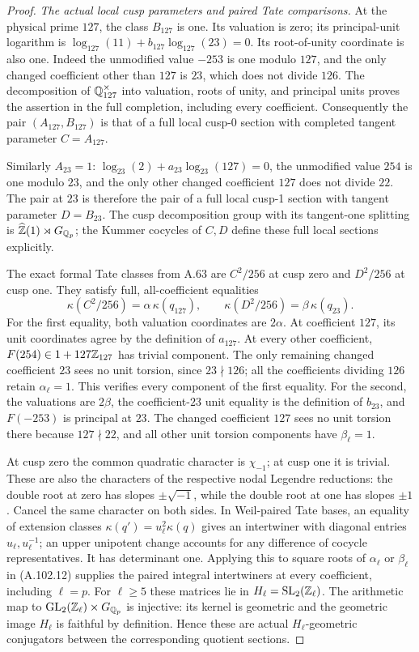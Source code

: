 \begin{proof}
\emph{The actual local cusp parameters and paired Tate comparisons.}
At the physical prime $127$, the class $B_{127}$ is
one.  Its valuation is zero; its principal-unit
logarithm is
$\log_{127}(11)+b_{127}\log_{127}(23)=0$.
Its root-of-unity coordinate is also one.
Indeed the unmodified value $-253$ is one modulo $127$,
and the only changed coefficient other than $127$ is
$23$, which does not divide $126$.
The decomposition of $\mathbb Q_{127}^\times$ into valuation,
roots of unity, and principal units proves the assertion
in the full completion, including every coefficient.
Consequently the pair $(A_{127},B_{127})$ is that of
a full local cusp-0 section with completed tangent
parameter $C=A_{127}$.

Similarly $A_{23}=1$:
$\log_{23}(2)+a_{23}\log_{23}(127)=0$,
the unmodified value $254$ is one modulo $23$, and
the only other changed coefficient $127$ does not
divide $22$.
The pair at $23$ is therefore the pair of a full
local cusp-1 section with tangent parameter $D=B_{23}$.
The cusp decomposition group with its tangent-one
splitting is $\widehat{\mathbb Z}(1)\rtimes G_{\mathbb Q_p}$;
the Kummer cocycles of $C,D$ define these full local
sections explicitly.

The exact formal Tate classes from A.63 are
$C^2/256$ at cusp zero and $D^2/256$ at cusp one.
They satisfy full, all-coefficient equalities
\[
       \kappa(C^2/256)=\alpha\,\kappa(q_{127}),
          \qquad
       \kappa(D^2/256)=\beta\,\kappa(q_{23}).
\tag{A.102.12}
\]
For the first equality, both valuation coordinates
are $2\alpha$.  At coefficient $127$, its unit
coordinates agree by the definition of $a_{127}$.
At every other coefficient, $F(254)\in1+127\mathbb Z_{127}$
has trivial component.  The only remaining changed
coefficient $23$ sees no unit torsion, since
$23\nmid126$; all the coefficients dividing $126$
retain $\alpha_\ell=1$.  This verifies every component
of the first equality.
For the second, the valuations are $2\beta$, the
coefficient-$23$ unit equality is the definition of
$b_{23}$, and $F(-253)$ is principal at $23$.
The changed coefficient $127$ sees no unit torsion
there because $127\nmid22$, and all other unit
torsion components have $\beta_\ell=1$.

At cusp zero the common quadratic character is
$\chi_{-1}$; at cusp one it is trivial.  These are
also the characters of the respective nodal
Legendre reductions: the double root at zero has
slopes $\pm\sqrt{-1}$, while the double root at
one has slopes $\pm1$.
Cancel the same character on both sides.
In Weil-paired Tate bases, an equality of extension
classes $\kappa(q')=u_\ell^2\kappa(q)$ gives an
intertwiner with diagonal entries
$u_\ell,u_\ell^{-1}$; an upper unipotent change
accounts for any difference of cocycle representatives.
It has determinant one.  Applying this to square
roots of $\alpha_\ell$ or $\beta_\ell$ in
(A.102.12) supplies the paired integral intertwiners
at every coefficient, including $\ell=p$.
For $\ell\ge5$ these matrices lie in
$H_\ell=\operatorname{SL}_2(\mathbb Z_\ell)$.
The arithmetic map to
$\operatorname{GL}_2(\mathbb Z_\ell)\times G_{\mathbb Q_p}$
is injective: its kernel is geometric and the
geometric image $H_\ell$ is faithful by definition.
Hence these are actual $H_\ell$-geometric conjugators
between the corresponding quotient sections.


\end{proof}
